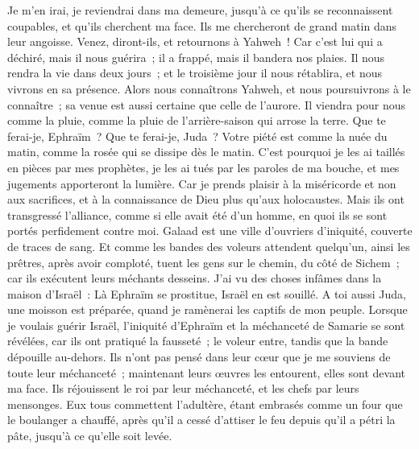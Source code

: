 \begin{multicols}{2}
Je m'en irai, je reviendrai dans ma demeure, jusqu'à ce qu'ils se reconnaissent coupables, et qu'ils cherchent ma face. Ils me chercheront de grand matin dans leur angoisse.
\VerseOne{}Venez, diront-ils, et retournons à Yahweh~! Car c'est lui qui a déchiré, mais il nous guérira~; il a frappé, mais il bandera nos plaies.
Il nous rendra la vie dans deux jours~; et le troisième jour il nous rétablira, et nous vivrons en sa présence.
Alors nous connaîtrons Yahweh, et nous poursuivrons à le connaître~; sa venue est aussi certaine que celle de l'aurore. Il viendra pour nous comme la pluie, comme la pluie de l'arrière-saison qui arrose la terre.
Que te ferai-je, Ephraïm~? Que te ferai-je, Juda~? Votre piété est comme la nuée du matin, comme la rosée qui se dissipe dès le matin.
C'est pourquoi je les ai taillés en pièces par mes prophètes, je les ai tués par les paroles de ma bouche, et mes jugements apporteront la lumière.
Car je prends plaisir à la miséricorde et non aux sacrifices, et à la connaissance de Dieu plus qu'aux holocaustes.
Mais ils ont transgressé l'alliance, comme si elle avait été d'un homme, en quoi ils se sont portés perfidement contre moi.
Galaad est une ville d'ouvriers d'iniquité, couverte de traces de sang.
Et comme les bandes des voleurs attendent quelqu'un, ainsi les prêtres, après avoir comploté, tuent les gens sur le chemin, du côté de Sichem~; car ils exécutent leurs méchants desseins.
J'ai vu des choses infâmes dans la maison d'Israël~: Là Ephraïm se prostitue, Israël en est souillé.
A toi aussi Juda, une moisson est préparée, quand je ramènerai les captifs de mon peuple.
\VerseOne{}Lorsque je voulais guérir Israël, l'iniquité d'Ephraïm et la méchanceté de Samarie se sont révélées, car ils ont pratiqué la fausseté~; le voleur entre, tandis que la bande dépouille au-dehors.
Ils n'ont pas pensé dans leur cœur que je me souviens de toute leur méchanceté~; maintenant leurs œuvres les entourent, elles sont devant ma face.
Ils réjouissent le roi par leur méchanceté, et les chefs par leurs mensonges.
Eux tous commettent l'adultère, étant embrasés comme un four que le boulanger a chauffé, après qu'il a cessé d'attiser le feu depuis qu'il a pétri la pâte, jusqu'à ce qu'elle soit levée.

\end{multicols}
